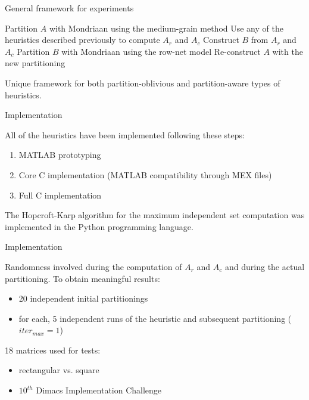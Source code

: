 \begin{frame}{General framework for experiments}
	\begin{algorithm}[H]
		\small
		\begin{algorithmic}
			\State Partition $A$ with Mondriaan using the medium-grain method
			\State Use any of the heuristics described previously to compute $A_r$ and $A_c$
			\State Construct $B$ from $A_r$ and $A_c$
			\State Partition $B$ with Mondriaan using the row-net model
			\State Re-construct $A$ with the new partitioning
			\EndFor
		\end{algorithmic}
	\end{algorithm}

	Unique framework for both partition-oblivious and partition-aware types of heuristics.

\end{frame}

\begin{frame}{Implementation}

	All of the heuristics have been implemented following these steps:

\begin{enumerate}\itemsep=0.3cm
		\item MATLAB prototyping
		\item Core C implementation (MATLAB compatibility through MEX files)
		\item Full C implementation
	\end{enumerate}

	The Hopcroft-Karp algorithm for the maximum independent set computation was implemented in the Python programming language.

\end{frame}

\begin{frame}{Implementation}

	Randomness involved during the computation of $A_r$ and $A_c$ and during the actual partitioning. To obtain meaningful results:

	\begin{itemize}
		\item 20 independent initial partitionings
		\item for each, 5 independent runs of the heuristic and subsequent partitioning ($iter_{max} = 1$)
	\end{itemize}

	18 matrices used for tests: 
	\begin{itemize}
		\item rectangular vs. square
		\item $10^{th}$ Dimacs Implementation Challenge
	\end{itemize}
\end{frame}

